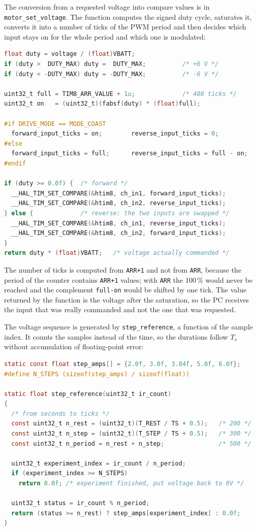 \documentclass[english]{article}
\begin{document}
\noindent The conversion from a requested voltage into compare values is in \texttt{motor\_set\_voltage}. The function
computes the signed duty cycle, saturates it, converts it into a number of ticks of the PWM period and then decides
which input stays on for the whole period and which one is modulated:

\begin{lstlisting}[language=C, caption={Voltage to PWM conversion with coast/brake selection.}, label={lst:lab2-motor}]
float duty = voltage / (float)VBATT;
if (duty >  DUTY_MAX) duty =  DUTY_MAX;          /* +6 V */
if (duty < -DUTY_MAX) duty = -DUTY_MAX;          /* -6 V */

uint32_t full = TIM8_ARR_VALUE + 1u;             /* 400 ticks */
uint32_t on   = (uint32_t)(fabsf(duty) * (float)full);

#if DRIVE_MODE == MODE_COAST
  forward_input_ticks = on;        reverse_input_ticks = 0;
#else
  forward_input_ticks = full;      reverse_input_ticks = full - on;
#endif

if (duty >= 0.0f) {  /* forward */
  __HAL_TIM_SET_COMPARE(&htim8, ch_in1, forward_input_ticks);
  __HAL_TIM_SET_COMPARE(&htim8, ch_in2, reverse_input_ticks);
} else {             /* reverse: the two inputs are swapped */
  __HAL_TIM_SET_COMPARE(&htim8, ch_in1, reverse_input_ticks);
  __HAL_TIM_SET_COMPARE(&htim8, ch_in2, forward_input_ticks);
}
return duty * (float)VBATT;   /* voltage actually commanded */
\end{lstlisting}

\noindent The number of ticks is computed from \texttt{ARR+1} and not from \texttt{ARR}, because the period of the
counter contains \texttt{ARR+1} values; with \texttt{ARR} the 100\,\% would never be reached and the complement
\texttt{full-on} would be shifted by one tick. The value returned by the function is the voltage after the
saturation, so the PC receives the input that was really commanded and not the one that was requested.

The voltage sequence is generated by \texttt{step\_reference}, a function of the sample index. It counts the
samples instead of the time, so the durations follow $T_s$ without accumulation of floating-point error:

\begin{lstlisting}[language=C, caption={Automatic sequence of five steps.}, label={lst:lab2-step}]
static const float step_amps[] = {2.0f, 3.0f, 3.84f, 5.0f, 6.0f};
#define N_STEPS (sizeof(step_amps) / sizeof(float))

static float step_reference(uint32_t ir_count)
{
  /* from seconds to ticks */
  const uint32_t n_rest = (uint32_t)(T_REST / TS + 0.5);   /* 200 */
  const uint32_t n_step = (uint32_t)(T_STEP / TS + 0.5);   /* 300 */
  const uint32_t n_period = n_rest + n_step;               /* 500 */

  uint32_t experiment_index = ir_count / n_period;
  if (experiment_index >= N_STEPS)
    return 0.0f; /* experiment finished, put voltage back to 0V */

  uint32_t status = ir_count % n_period;
  return (status >= n_rest) ? step_amps[experiment_index] : 0.0f;
}
\end{lstlisting}
\end{document}
